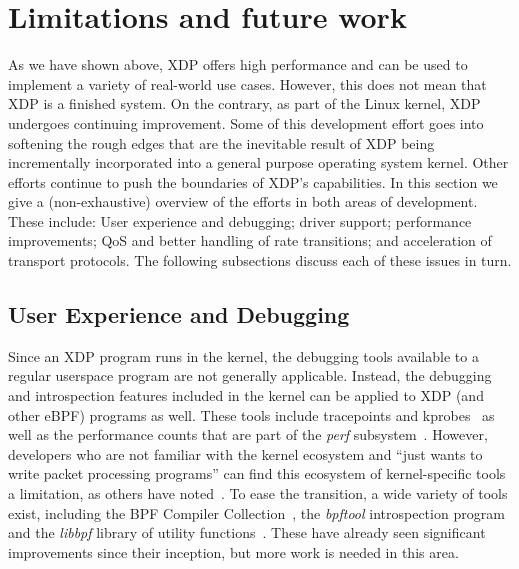 \documentclass[10pt,sigconf,anonymous]{acmart}
\begin{document}
\section{Limitations and future work}
\label{sec:limitations}
As we have shown above, XDP offers high performance and can be used to implement
a variety of real-world use cases. However, this does not mean that XDP is a
finished system. On the contrary, as part of the Linux kernel, XDP undergoes
continuing improvement. Some of this development effort goes into softening the
rough edges that are the inevitable result of XDP being incrementally
incorporated into a general purpose operating system kernel. Other efforts
continue to push the boundaries of XDP's capabilities. In this section we give a
(non-exhaustive) overview of the efforts in both areas of development. These
include: User experience and debugging; driver support; performance
improvements; QoS and better handling of rate transitions; and acceleration of
transport protocols. The following subsections discuss each of these issues in
turn.

\subsection{User Experience and Debugging}
\label{sec:user-exper-debugg}
Since an XDP program runs in the kernel, the debugging tools available to a
regular userspace program are not generally applicable. Instead, the debugging
and introspection features included in the kernel can be applied to XDP (and
other eBPF) programs as well. These tools include tracepoints and
kprobes~\cite{kernel-tracing} as well as the performance counts that are part of
the \emph{perf} subsystem~\cite{perf}. However, developers who are not familiar
with the kernel ecosystem and ``just wants to write packet processing programs''
can find this ecosystem of kernel-specific tools a limitation, as others have
noted~\cite{miano2018creating}. To ease the transition, a wide variety of tools
exist, including the BPF Compiler Collection~\cite{bcc}, the \emph{bpftool}
introspection program~\cite{bpftool} and the \emph{libbpf} library of utility
functions~\cite{libbpf}. These have already seen significant improvements since
their inception, but more work is needed in this area.
\end{document}
